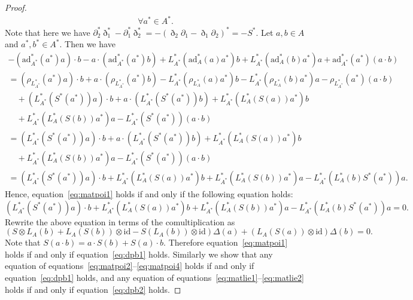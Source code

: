\documentclass[10pt,a4paper]{amsart}
\numberwithin{equation}{section}
\newcommand{\ad}{\mathrm{ad}}
\newcommand{\id}{\mathrm{id}}
\begin{document}
\begin{proof}
\begin{gather*}
 \forall a^* \in A^*.
 \end{gather*}
	Note that here we have $\partial_2^* \eth_1^* - \partial_1^* \eth_2^* = - (\eth_2 \partial_1 - \eth_1 \partial_2)^* = -S^*$.
 Let $a, b \in A$ and $a^*, b^* \in A^*$.
 Then we have
 \begin{gather*}
 -(\ad^*_{A^*}(a^*) a) \cdot b - a \cdot (\ad^*_{A^*}(a^*) b) + L^*_{A^*}(\ad^*_{A}(a)a^*)b + L^*_{A^*}(\ad^*_{A}(b)a^*) a + \ad^*_{A^*}(a^*)(a \cdot b) \\
 = (\rho_{L^*_{A^*}}(a^*) a) \cdot b + a \cdot (\rho_{L^*_{A^*}}(a^*) b) - L^*_{A^*}(\rho_{L^*_A}(a)a^*)b - L^*_{A^*}(\rho_{L^*_A}(b)a^*) a - \rho_{L^*_{A^*}}(a^*)(a \cdot b) \\
 \quad {}+(L^*_{A^*}(S^*(a^*)) a) \cdot b + a \cdot (L^*_{A^*}(S^*(a^*)) b) + L^*_{A^*}(L^*_A(S(a))a^*)b \\
 \quad {}+ L^*_{A^*}(L^*_A(S(b))a^*) a - L^*_{A^*}(S^*(a^*))(a \cdot b) \\
 = (L^*_{A^*}(S^*(a^*)) a) \cdot b + a \cdot (L^*_{A^*}(S^*(a^*)) b) + L^*_{A^*}(L^*_A(S(a))a^*)b \\
 \quad {}+ L^*_{A^*}(L^*_A(S(b))a^*) a - L^*_{A^*}(S^*(a^*))(a \cdot b) \\
 = (L^*_{A^*}(S^*(a^*)) a) \cdot b + L^*_{A^*}(L^*_A(S(a))a^*)b + L^*_{A^*}(L^*_A(S(b))a^*) a - L^*_{A^*}(L^*_A(b)S^*(a^*))a.
 \end{gather*}
 Hence, equation~\eqref{eq:matpoi1} holds if and only if the following equation holds:
 \begin{equation*}
 (L^*_{A^*}(S^*(a^*)) a) \cdot b + L^*_{A^*}(L^*_A(S(a))a^*)b + L^*_{A^*}(L^*_A(S(b))a^*) a - L^*_{A^*}(L^*_A(b)S^*(a^*))a = 0.
 \end{equation*}
 Rewrite the above equation in terms of the comultiplication as
 \begin{equation*}
 (S \otimes L_A(b) + L_A(S(b)) \otimes \id - S(L_A(b)) \otimes \id ) \Delta(a) + ( L_A(S(a)) \otimes \id) \Delta(b) = 0.
 \end{equation*}
 Note that $S(a \cdot b) = a \cdot S(b) + S(a) \cdot b$.
 Therefore equation~\eqref{eq:matpoi1} holds if and only if equation~\eqref{eq:dpb1} holds.
 Similarly we show that any equation of equations~\eqref{eq:matpoi2}--\eqref{eq:matpoi4} holds if and only if equation~\eqref{eq:dpb1} holds,
 and any equation of equations~\eqref{eq:matlie1}--\eqref{eq:matlie2} holds if and only if equation~\eqref{eq:dpb2} holds.
\end{proof}
\end{document}
